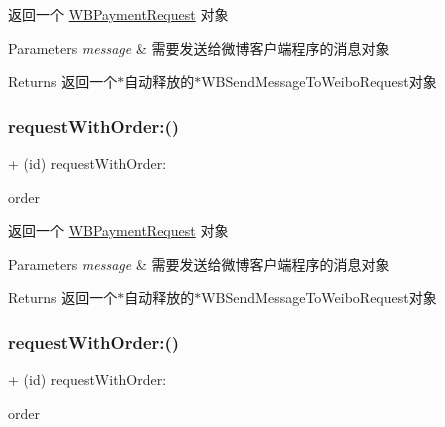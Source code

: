 返回一个 \mbox{\hyperlink{interface_w_b_payment_request}{W\+B\+Payment\+Request}} 对象 
\begin{DoxyParams}{Parameters}
{\em message} & 需要发送给微博客户端程序的消息对象 \\
\hline
\end{DoxyParams}
\begin{DoxyReturn}{Returns}
返回一个$\ast$自动释放的$\ast$\+W\+B\+Send\+Message\+To\+Weibo\+Request对象 
\end{DoxyReturn}
\mbox{\label{interface_w_b_payment_request_a52f05e2af96ca90661962e1b346135a6}} 
\subsubsection{\texorpdfstring{request\+With\+Order\+:()}{requestWithOrder:()}\hspace{0.1cm}{\footnotesize\ttfamily [2/3]}}
{\footnotesize\ttfamily + (id) request\+With\+Order\+: \begin{DoxyParamCaption}\item[{(\mbox{\hyperlink{interface_w_b_order_object}{W\+B\+Order\+Object}} $\ast$)}]{order }\end{DoxyParamCaption}}

返回一个 \mbox{\hyperlink{interface_w_b_payment_request}{W\+B\+Payment\+Request}} 对象 
\begin{DoxyParams}{Parameters}
{\em message} & 需要发送给微博客户端程序的消息对象 \\
\hline
\end{DoxyParams}
\begin{DoxyReturn}{Returns}
返回一个$\ast$自动释放的$\ast$\+W\+B\+Send\+Message\+To\+Weibo\+Request对象 
\end{DoxyReturn}
\mbox{\label{interface_w_b_payment_request_a52f05e2af96ca90661962e1b346135a6}} 
\subsubsection{\texorpdfstring{request\+With\+Order\+:()}{requestWithOrder:()}\hspace{0.1cm}{\footnotesize\ttfamily [3/3]}}
{\footnotesize\ttfamily + (id) request\+With\+Order\+: \begin{DoxyParamCaption}\item[{(\mbox{\hyperlink{interface_w_b_order_object}{W\+B\+Order\+Object}} $\ast$)}]{order }\end{DoxyParamCaption}}

